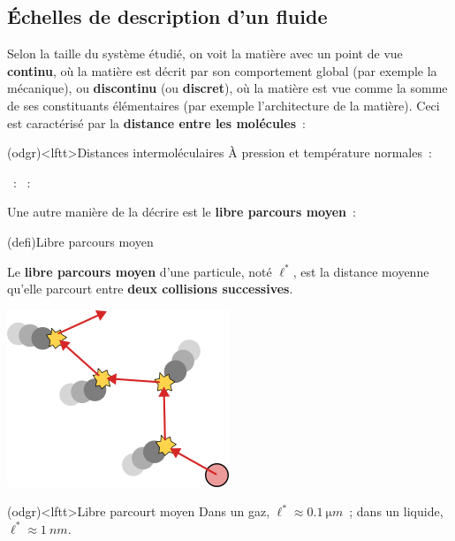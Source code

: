 \documentclass[../../main/main.tex]{subfiles}
\begin{document}
\subsection{Échelles de description d'un fluide}

Selon la taille du système étudié, on voit la matière avec un point de vue
\textbf{continu}, où la matière est décrit par son comportement global (par
exemple la mécanique), ou \textbf{discontinu} (ou \textbf{discret}), où la
matière est vue comme la somme de ses constituants élémentaires (par exemple
l'architecture de la matière). Ceci est caractérisé par la \textbf{distance
	entre les molécules}~:
\begin{tcb}(odgr)<lftt>{Distances intermoléculaires}
	À pression et température normales~:
	\begin{itemize}
		~:
		~:
	\end{itemize}
\end{tcb}

Une autre manière de la décrire est le \textbf{libre parcours moyen}~:
\begin{tcb}(defi){Libre parcours moyen}
	\noindent
	\begin{minipage}[c]{.75\linewidth}
		Le \textbf{libre parcours moyen} d'une particule, noté $\ell^*$, est la
		distance moyenne qu'elle parcourt entre \textbf{deux collisions successives}.
	\end{minipage}
	\hfill
	\begin{minipage}[c]{.23\linewidth}
		\vspace{0pt}
		\begin{center}
			\includegraphics[width=\linewidth]{lbr_prcs}
		\end{center}
	\end{minipage}
\end{tcb}
\begin{tcb}(odgr)<lftt>{Libre parcourt moyen}
	Dans un gaz, $\ell^* \approx \SI{0.1}{\micro m}$~; dans un liquide, $\ell^*
		\approx \SI{1}{nm}$.
\end{tcb}
\end{document}
